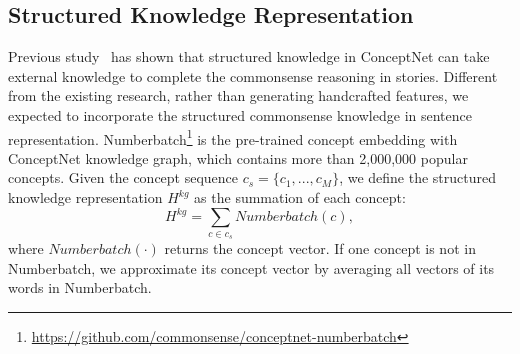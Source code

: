 





\subsection*{Structured Knowledge Representation}

Previous study~\cite{chen2018incorporating} has shown that
structured knowledge in ConceptNet can take external knowledge to
complete the commonsense reasoning in stories.
Different from the existing research,
rather than generating handcrafted features,
we expected to incorporate the structured commonsense knowledge
in sentence representation.
Numberbatch\footnote{\url{https://github.com/commonsense/conceptnet-numberbatch}}
is the pre-trained concept embedding with ConceptNet knowledge graph,
which contains more than 2,000,000 popular concepts.
Given the concept sequence $c_s = \{c_1, ..., c_M\}$,
we define the structured knowledge representation $H^{kg}$
as the summation of each concept:
\begin{equation}
  H^{kg} = \sum_{c \in c_s}{Numberbatch(c)},
\end{equation}
\noindent
where $Numberbatch(\cdot)$ returns the concept vector.
If one concept is not in Numberbatch, we approximate its concept vector
by averaging all vectors of its words in Numberbatch.

